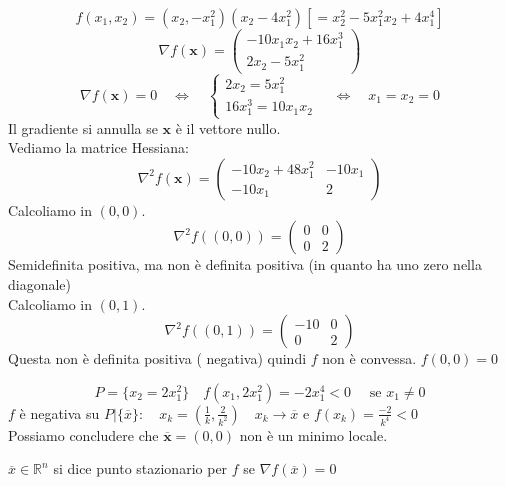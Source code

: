 
\begin{example}
$$ f(x_1, x_2) =  (x_2, -x_1^{2}) (x_2 - 4x_{1}^2) [ = x_2^{2} - 5x_1^{2}x_2 + 4x_{1}^{4}]$$
 $$ \nabla f(\mathbf{x}) = 
\begin{pmatrix}
-10 x_1 x_2 + 16 x_1^3\\
2 x_2 - 5 x_1^2
\end{pmatrix}
$$
$$
\nabla f(\mathbf{x}) = 0
\quad 
\Longleftrightarrow
\quad
\left\{
\begin{array}{ll}
 2x_{2} = 5x_1^{2} \\
 16x_{1}^{3} = 10x_1 x_2 
\end{array}
\right.
\quad 
\Longleftrightarrow
\quad
x_1 = x_2 =0
$$
Il gradiente si annulla se
$\mathbf{x}$ è il vettore nullo. \\

Vediamo la matrice Hessiana:
$$ \nabla^{2}f(\mathbf{x}) =
\begin{pmatrix}
 -10 x_2 + 48x_1^{2} & -10x_1 \\
  -10x_1 & 2
\end{pmatrix}
$$
Calcoliamo in $(0,0)$.
$$ \nabla^{2} f((0,0)) =
\begin{pmatrix}
 0 & 0 \\
 0 & 2
\end{pmatrix}
$$
Semidefinita positiva, ma non è definita positiva (in quanto ha uno zero  nella diagonale) \\
Calcoliamo in $(0,1)$.
$$ \nabla^{2} f((0,1)) =
\begin{pmatrix}
 -10 & 0 \\
 0 & 2
\end{pmatrix}
$$
Questa non è definita positiva ( negativa) quindi $f$ non è convessa.
$ f(0,0) = 0$

$$ P = \{x_2 = 2x_1^2 \}
\quad
 f(x_1, 2x_1^2) = -2x_1^{4} < 0 \quad \text{ se }  x_1 \neq 0$$
$f$ \`e negativa su $P|\{\overline{x}\} :
\quad x_k = (\frac{1}{k}, \frac{2}{k^2})
\quad x_k \rightarrow \overline{x}
\text{ e }
f(x_k) = \frac{-2}{k^4} <0$ \\
Possiamo concludere che $\overline{\mathbf{x}} = (0,0)$ non è un minimo locale.
\end{example}


\begin{defn}
 $\overline{x} \in \mathbb{R}^{n}$ si dice punto stazionario per $f$ se $\nabla f(\overline{x}) = 0$
\end{defn}


